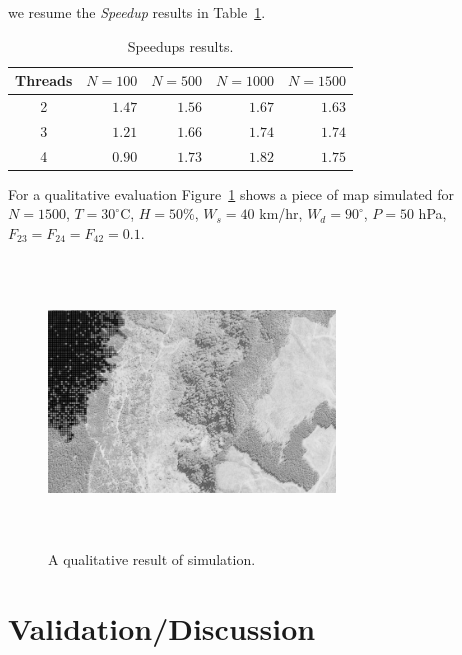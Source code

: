\documentclass[conference]{IEEEtran}
\begin{document}
    we resume the \emph{Speedup} results in Table~\ref{tab:speedups}.
    
    \begin{table}[h]
      \renewcommand{\arraystretch}{1.3}
      \centering
      \caption{Speedups results.}
      \label{tab:speedups}
      \begin{tabular}{c||rrrr}
        \hline
        Threads & $N=100$ & $N=500$ & $N=1000$ & $N=1500$ \\ \hline\hline
        2       & $1.47$ & $1.56$ & $1.67$ & $1.63$ \\
        3       & $1.21$ & $1.66$ & $1.74$ & $1.74$ \\
        4       & $0.90$ & $1.73$ & $1.82$ & $1.75$ \\ \hline
      \end{tabular}
    \end{table}
    
    For a qualitative evaluation Figure~\ref{fig:simulation} shows a piece of map simulated for 
    $N=1500$, $T=30^{\circ}$C, $H=50$\%, $W_s=40$ km/hr, $W_d=90^{\circ}$, $P=50$ hPa, 
    $F_{23} = F_{24}= F_{42} = 0.1$.
    
    \begin{figure}[h]
      \centering
      \includegraphics[width=3in,height=3in,clip,keepaspectratio]{figures/simulation_gray.png}
      \caption{A qualitative result of simulation.}
      \label{fig:simulation}
    \end{figure}
    

  \section{Validation/Discussion}
    
\end{document}
